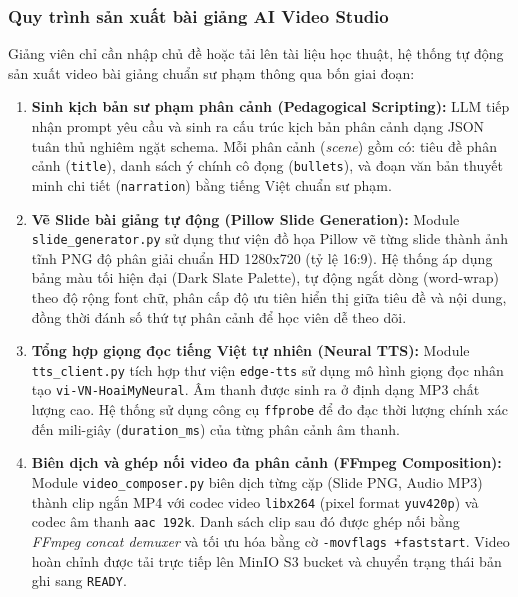\subsubsection{Quy trình sản xuất bài giảng AI Video Studio}
Giảng viên chỉ cần nhập chủ đề hoặc tải lên tài liệu học thuật, hệ thống tự động
sản xuất video bài giảng chuẩn sư phạm thông qua bốn giai đoạn:
\begin{enumerate}
    \item \textbf{Sinh kịch bản sư phạm phân cảnh (Pedagogical Scripting):} LLM
          tiếp nhận prompt yêu cầu và sinh ra cấu trúc kịch bản phân cảnh dạng
          JSON tuân thủ nghiêm ngặt schema. Mỗi phân cảnh (\textit{scene}) gồm
          có: tiêu đề phân cảnh (\texttt{title}), danh sách ý chính cô đọng
          (\texttt{bullets}), và đoạn văn bản thuyết minh chi tiết
          (\texttt{narration}) bằng tiếng Việt chuẩn sư phạm.
    \item \textbf{Vẽ Slide bài giảng tự động (Pillow Slide Generation):} Module
          \texttt{slide\_generator.py} sử dụng thư viện đồ họa Pillow vẽ từng
          slide thành ảnh tĩnh PNG độ phân giải chuẩn HD 1280x720 (tỷ lệ 16:9).
          Hệ thống áp dụng bảng màu tối hiện đại (Dark Slate Palette), tự động
          ngắt dòng (word-wrap) theo độ rộng font chữ, phân cấp độ ưu tiên hiển
          thị giữa tiêu đề và nội dung, đồng thời đánh số thứ tự phân cảnh để
          học viên dễ theo dõi.
    \item \textbf{Tổng hợp giọng đọc tiếng Việt tự nhiên (Neural TTS):} Module
          \texttt{tts\_client.py} tích hợp thư viện \texttt{edge-tts} sử dụng
          mô hình giọng đọc nhân tạo \texttt{vi-VN-HoaiMyNeural}. Âm thanh được
          sinh ra ở định dạng MP3 chất lượng cao. Hệ thống sử dụng công cụ
          \texttt{ffprobe} để đo đạc thời lượng chính xác đến mili-giây
          (\texttt{duration\_ms}) của từng phân cảnh âm thanh.
    \item \textbf{Biên dịch và ghép nối video đa phân cảnh (FFmpeg Composition):}
          Module \texttt{video\_composer.py} biên dịch từng cặp (Slide PNG, Audio MP3)
          thành clip ngắn MP4 với codec video \texttt{libx264} (pixel format \texttt{yuv420p})
          và codec âm thanh \texttt{aac 192k}. Danh sách clip sau đó được ghép nối
          bằng \textit{FFmpeg concat demuxer} và tối ưu hóa bằng cờ \texttt{-movflags +faststart}.
          Video hoàn chỉnh được tải trực tiếp lên MinIO S3 bucket và chuyển trạng thái
          bản ghi sang \texttt{READY}.
\end{enumerate}

